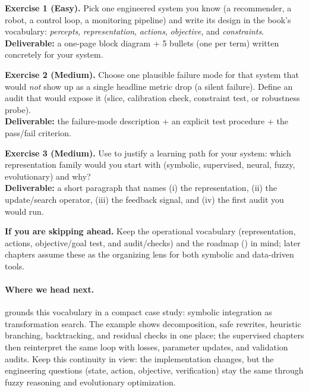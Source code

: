 \begin{tcolorbox}[summarybox, title={Exercises}]
\textbf{Exercise 1 (Easy).} Pick one engineered system you know (a recommender, a robot, a control loop, a monitoring pipeline) and write its design in the book's vocabulary: \emph{percepts}, \emph{representation}, \emph{actions}, \emph{objective}, and \emph{constraints}. \\
\textbf{Deliverable:} a one-page block diagram + 5 bullets (one per term) written concretely for your system.

\smallskip
\textbf{Exercise 2 (Medium).} Choose one plausible failure mode for that system that would \emph{not} show up as a single headline metric drop (a silent failure). Define an audit that would expose it (slice, calibration check, constraint test, or robustness probe). \\
\textbf{Deliverable:} the failure-mode description + an explicit test procedure + the pass/fail criterion.

\smallskip
\textbf{Exercise 3 (Medium).} Use  to justify a learning path for your system: which representation family would you start with (symbolic, supervised, neural, fuzzy, evolutionary) and why? \\
\textbf{Deliverable:} a short paragraph that names (i) the representation, (ii) the update/search operator, (iii) the feedback signal, and (iv) the first audit you would run.
\par\medskip
\noindent\textbf{If you are skipping ahead.} Keep the operational vocabulary (representation, actions, objective/goal test, and audit/checks) and the roadmap () in mind; later chapters assume these as the organizing lens for both symbolic and data-driven tools.
\end{tcolorbox}

\paragraph{Where we head next.}  grounds this vocabulary in a compact case study: symbolic integration as transformation search. The example shows decomposition, safe rewrites, heuristic branching, backtracking, and residual checks in one place; the supervised chapters then reinterpret the same loop with losses, parameter updates, and validation audits. Keep this continuity in view: the implementation changes, but the engineering questions (state, action, objective, verification) stay the same through fuzzy reasoning and evolutionary optimization.
